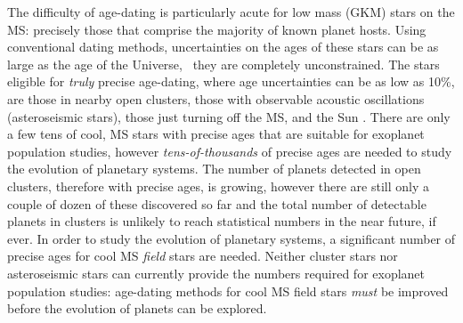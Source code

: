 
The difficulty of age-dating is particularly acute for low mass (GKM) stars on
the MS: precisely those that comprise the majority of known planet hosts.
Using conventional dating methods, uncertainties on the ages of these stars
can be as large as the age of the Universe, \ie\ they are completely
unconstrained.
The stars eligible for {\it truly} precise age-dating, where age uncertainties
can be as low as 10\%, are those in nearby open clusters, those with
observable acoustic oscillations (asteroseismic stars), those just turning off
the MS, and the Sun
\citep[see][for a review of stellar ages]{soderblom2010}.
There are only a few tens of cool, MS stars with precise ages that are
suitable for exoplanet population studies, however {\it tens-of-thousands} of
precise ages are needed to study the evolution of planetary systems.
The number of planets detected in open clusters, therefore with precise ages,
is growing, however there are still only a couple of dozen of these discovered
so far and the total number of detectable planets in clusters is unlikely to
reach statistical numbers in the near future, if ever.
In order to study the evolution of planetary systems, a significant number of
precise ages for cool MS {\it field} stars are needed.
Neither cluster stars nor asteroseismic stars can currently provide the
numbers required for exoplanet population studies: age-dating methods for cool
MS field stars {\it must} be improved before the evolution of planets can be
explored.

